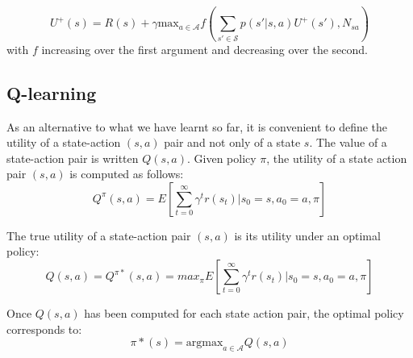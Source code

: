 \begin{equation}
	U^{+}(s) = R(s) + \gamma \text{max}_{a \in \mathcal{A}}f(\sum_{s' \in \mathcal{S}}
	p(s' | s,a) U^{+}(s'), N_{sa})
\end{equation}
with $f$ increasing over the first argument and decreasing over the second.

\subsection{Q-learning}
As an alternative to what we have learnt so far, it is convenient to define the utility
of a state-action $(s,a)$ pair and not only of a state $s$. The value of a state-action
pair is written $Q(s,a)$. Given policy $\pi$, the utility of a state action pair
$(s,a)$ is computed as follows:
\begin{equation}
	Q^{\pi}(s,a) = E[\sum_{t=0}^{\infty}\gamma^{t} r(s_{t}) | s_{0} = s, a_{0} = a,
	\pi]
\end{equation}

The true utility of a state-action pair $(s,a)$ is its utility under an optimal
policy:
\begin{equation}
	Q(s,a) = Q^{\pi*}(s,a) = max_{\pi}E[\sum_{t=0}^{\infty}\gamma^{t} r(s_{t}) | s_{0}
	= s, a_{0} = a, \pi]
\end{equation}

Once $Q(s,a)$ has been computed for each state action pair, the optimal policy corresponds
to:
\begin{equation}
	\pi*(s) = \text{argmax}_{a \in \mathcal{A}}Q(s,a)
\end{equation}

